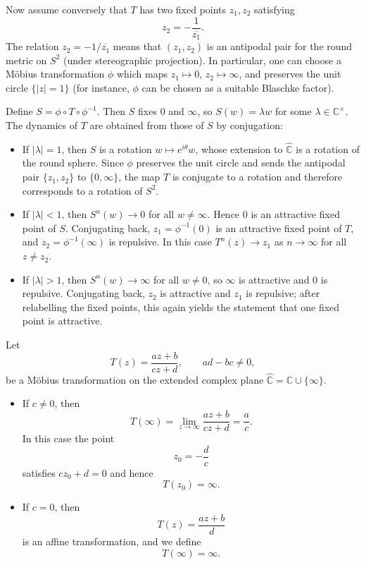 \documentclass[12pt,a4paper]{article}
\theoremstyle{plain}
\theoremstyle{definition}      %
\begin{document}
Now assume conversely that $T$ has two fixed points $z_{1},z_{2}$ satisfying
\[
z_{2} = -\frac{1}{\overline{z_{1}}}.
\]
The relation $z_{2}=-1/\overline{z_{1}}$ means that $(z_{1},z_{2})$ is an
antipodal pair for the round metric on $S^{2}$ (under stereographic
projection).  In particular, one can choose a M\"obius transformation
$\phi$ which maps $z_{1}\mapsto 0$, $z_{2}\mapsto\infty$, and preserves the
unit circle $\{|z|=1\}$ (for instance, $\phi$ can be chosen as a suitable
Blaschke factor).

Define $S = \phi\circ T\circ\phi^{-1}$.  Then $S$ fixes $0$ and $\infty$,
so $S(w)=\lambda w$ for some $\lambda\in\mathbb{C}^{\times}$.  The dynamics
of $T$ are obtained from those of $S$ by conjugation:

\begin{itemize}
	\item If $|\lambda|=1$, then $S$ is a rotation $w\mapsto e^{i\theta}w$,
	whose extension to $\widehat{\mathbb{C}}$ is a rotation of the
	round sphere.  Since $\phi$ preserves the unit circle and sends the
	antipodal pair $\{z_{1},z_{2}\}$ to $\{0,\infty\}$, the map $T$ is
	conjugate to a rotation and therefore corresponds to a rotation of
	$S^{2}$.
	\item If $|\lambda|<1$, then $S^{n}(w)\to 0$ for all $w\neq\infty$.  Hence
	$0$ is an attractive fixed point of $S$.  Conjugating back,
	$z_{1}=\phi^{-1}(0)$ is an attractive fixed point of $T$, and
	$z_{2}=\phi^{-1}(\infty)$ is repulsive.  In this case
	$T^{n}(z)\to z_{1}$ as $n\to\infty$ for all $z\neq z_{2}$.
	\item If $|\lambda|>1$, then $S^{n}(w)\to\infty$ for all $w\neq 0$, so
	$\infty$ is attractive and $0$ is repulsive.  Conjugating back,
	$z_{2}$ is attractive and $z_{1}$ is repulsive; after relabelling
	the fixed points, this again yields the statement that one fixed
	point is attractive.
\end{itemize}


Let
\[
T(z) = \frac{az+b}{cz+d}, \qquad ad-bc \neq 0,
\]
be a M\"obius transformation on the extended complex plane
\(\widehat{\mathbb{C}} = \mathbb{C}\cup\{\infty\}\).

\begin{itemize}
	\item If \(c \neq 0\), then
	\[
	T(\infty)
	= \lim_{z\to\infty} \frac{az+b}{cz+d}
	= \frac{a}{c}.
	\]
	In this case the point
	\[
	z_{0} = -\frac{d}{c}
	\]
	satisfies \(cz_{0}+d=0\) and hence
	\[
	T(z_{0}) = \infty.
	\]
	
	\item If \(c = 0\), then
	\[
	T(z) = \frac{az+b}{d}
	\]
	is an affine transformation, and we define
	\[
	T(\infty) = \infty.
	\]
\end{itemize}
\end{document}
